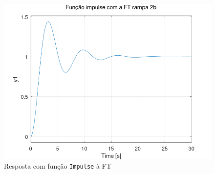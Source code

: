 \documentclass[a4paper,12pt]{article}
\begin{document}
    \begin{figure}[h]
        \centering
        \includegraphics[scale=0.4]{../fig/fig2bImpulse.png}
        \caption{Resposta com função \texttt{Impulse} à FT}
        \label{fig2bImpulse}
    \end{figure}


    \clearpage
    \printbibliography
\end{document}
